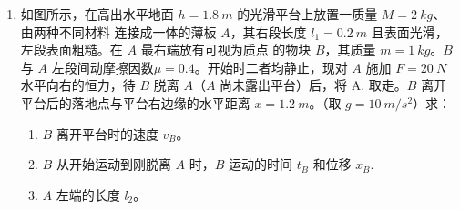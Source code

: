 \begin{enumerate}


\newpage

\item
{}
如图所示，在高出水平地面 $ h=1.8 \ m $ 的光滑平台上放置一质量 $ M=2 \ kg $、由两种不同材料
连接成一体的薄板 $ A $，其右段长度 $ l_{1} =0.2 \ m $ 且表面光滑，左段表面粗糙。在 $ A $ 最右端放有可视为质点
的物块 $ B $，其质量 $ m=1 \ kg $。$ B $ 与 $ A $ 左段间动摩擦因数$ \mu =0.4 $。开始时二者均静止，现对 $ A $ 施加 $ F=20 \ N $
水平向右的恒力，待 $ B $ 脱离 $ A $（$ A $ 尚未露出平台）后，将
A. 取走。$ B $ 离开平台后的落地点与平台右边缘的水平距离
$ x=1.2 \ m $。（取 $ g=10 \ m/s^{2} $）求：
\begin{enumerate}
\renewcommand{\labelenumi}{\arabic{enumi}.}
\item
$ B $ 离开平台时的速度 $ v_{B} $。
\item 
$ B $ 从开始运动到刚脱离 $ A $ 时，$ B $ 运动的时间 $ t_{B} $ 和位移 $ x_{B} $.

\item 
$ A $ 左端的长度 $ l_{2} $。




\end{enumerate}
\begin{figure}[h!]
\flushright

\end{figure}


\end{enumerate}
